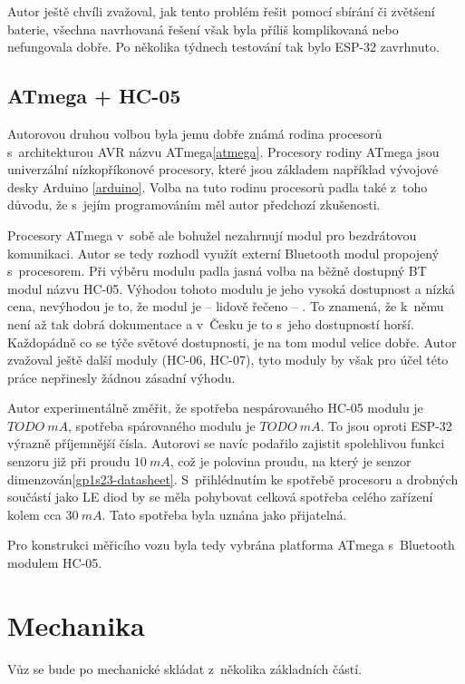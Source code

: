 Autor ještě chvíli zvažoval, jak tento problém řešit pomocí sbírání či zvětšení
baterie, všechna navrhovaná řešení však byla příliš komplikovaná nebo
nefungovala dobře. Po několika týdnech testování tak bylo ESP-32 zavrhnuto.

\subsection{ATmega + HC-05}
\label{subsec:wsm-atmega}

Autorovou druhou volbou byla jemu dobře známá rodina procesorů s~architekturou
AVR názvu ATmega\ref{atmega}. Procesory rodiny ATmega jsou univerzální
nízkopříkonové procesory, které jsou základem například vývojové desky Arduino
\ref{arduino}. Volba na tuto rodinu procesorů padla také z~toho důvodu, že
s~jejím programováním měl autor předchozí zkušenosti.

Procesory ATmega v~sobě ale bohužel nezahrnují modul pro bezdrátovou komunikaci.
Autor se tedy rozhodl využít externí Bluetooth modul propojený s~procesorem.
Při výběru modulu padla jasná volba na běžně dostupný BT modul názvu HC-05.
Výhodou tohoto modulu je jeho vysoká dostupnost a nízká cena, nevýhodou je to,
že modul je -- lidově řečeno -- . To znamená, že k~němu není až
tak dobrá dokumentace a v~Česku je to s~jeho dostupností horší. Každopádně
co se týče světové dostupnosti, je na tom modul velice dobře. Autor zvažoval
ještě další moduly (HC-06, HC-07), tyto moduly by však pro účel této práce
nepřinesly žádnou zásadní výhodu.

Autor experimentálně změřit, že spotřeba nespárovaného HC-05 modulu je
$TODO\ mA$, spotřeba spárovaného modulu je $TODO\ mA$. To jsou oproti ESP-32
výrazně příjemnější čísla. Autorovi se navíc podařilo zajistit spolehlivou
funkci senzoru již při proudu $10\ mA$, což je polovina proudu, na který
je senzor dimenzován\ref{gp1s23-datasheet}. S~přihlédnutím ke spotřebě procesoru
a drobných součástí jako LE diod by se měla pohybovat celková spotřeba celého
zařízení kolem cca $30\ mA$. Tato spotřeba byla uznána jako přijatelná.

Pro konstrukci měřicího vozu byla tedy vybrána platforma ATmega s~Bluetooth
modulem HC-05.

\section{Mechanika}
\label{sec:wsm-mech}

Vůz se bude po mechanické skládat z~několika základních částí.

